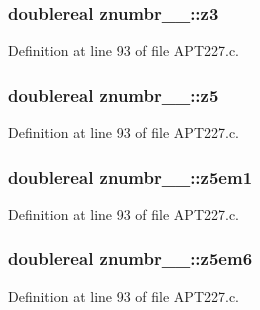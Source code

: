 \subsubsection[{\texorpdfstring{z3}{z3}}]{\setlength{\rightskip}{0pt plus 5cm}doublereal znumbr\+\_\+\_\+\+::z3}\hypertarget{structznumbr__1___a2aa74464a6f57ce24148b804051e0465}{}\label{structznumbr__1___a2aa74464a6f57ce24148b804051e0465}


Definition at line 93 of file A\+P\+T227.\+c.

\subsubsection[{\texorpdfstring{z5}{z5}}]{\setlength{\rightskip}{0pt plus 5cm}doublereal znumbr\+\_\+\_\+\+::z5}\hypertarget{structznumbr__1___aa490154afd464289e2339168a502e476}{}\label{structznumbr__1___aa490154afd464289e2339168a502e476}


Definition at line 93 of file A\+P\+T227.\+c.

\subsubsection[{\texorpdfstring{z5em1}{z5em1}}]{\setlength{\rightskip}{0pt plus 5cm}doublereal znumbr\+\_\+\_\+\+::z5em1}\hypertarget{structznumbr__1___a452fc3e9d17760ceed1497fc42a4fa33}{}\label{structznumbr__1___a452fc3e9d17760ceed1497fc42a4fa33}


Definition at line 93 of file A\+P\+T227.\+c.

\subsubsection[{\texorpdfstring{z5em6}{z5em6}}]{\setlength{\rightskip}{0pt plus 5cm}doublereal znumbr\+\_\+\_\+\+::z5em6}\hypertarget{structznumbr__1___ad464dc774032378a5ba1a3409d6d0d33}{}\label{structznumbr__1___ad464dc774032378a5ba1a3409d6d0d33}


Definition at line 93 of file A\+P\+T227.\+c.

